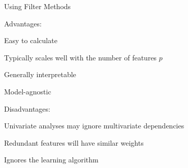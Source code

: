 \documentclass[11pt,compress,t,notes=noshow, xcolor=table]{beamer}
\begin{document}
\begin{vbframe}{Using Filter Methods}
  \begin{blocki}{Advantages:}
  \setlength{\itemsep}{1.2em}
    \item Easy to calculate
    \item Typically scales well with the number of features $p$
    \item Generally interpretable
    \item Model-agnostic
  \end{blocki}

  \begin{blocki}{Disadvantages:}
  \setlength{\itemsep}{1.2em}
    \item Univariate analyses may ignore multivariate dependencies
    \item Redundant features will have similar weights
    \item Ignores the learning algorithm
  \end{blocki}
  \end{vbframe}












\end{document}
